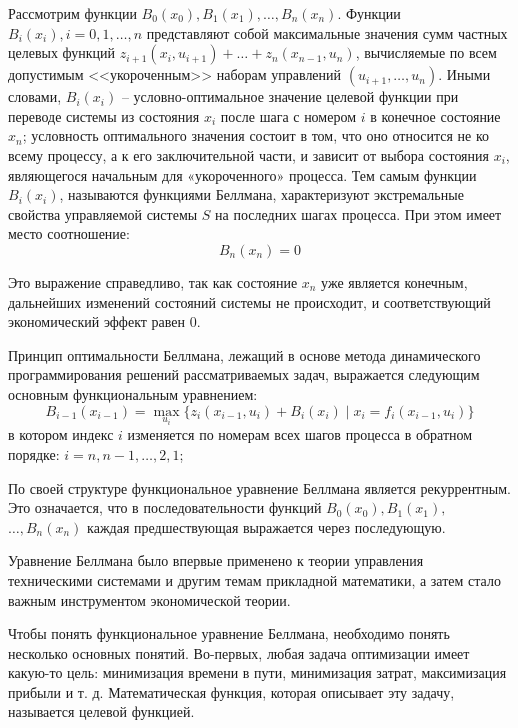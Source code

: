 Рассмотрим функции $B_0(x_0), B_1(x_1), \hdots, B_n(x_n)$. Функции $B_i(x_i), i = 0,1, \hdots, n$ представляют собой максимальные значения сумм частных целевых функций $z_{i+1}(x_i, u_{i+1}) + \hdots +z_n(x_{n−1}, u_n)$, вычисляемые по всем допустимым <<укороченным>> наборам управлений $(u_{i+1}, \hdots,u_n)$. Иными словами, $B_i(x_i)$ -- условно-оптимальное значение целевой функции при переводе системы из состояния $x_i$ после шага с номером $i$ в конечное состояние $x_n$; условность оптимального значения состоит в том, что оно относится не ко всему процессу, а к его заключительной части, и зависит от выбора состояния $x_i$, являющегося начальным для «укороченного» процесса. Тем самым функции $B_i(x_i)$, называются функциями Беллмана, характеризуют экстремальные свойства управляемой системы $S$ на последних шагах процесса. При этом имеет место соотношение:
\begin{equation}
    B_n(x_n) = 0
\end{equation}

Это выражение справедливо, так как состояние $x_n$ уже является конечным, дальнейших изменений состояний системы не происходит, и соответствующий экономический эффект равен 0.

Принцип оптимальности Беллмана, лежащий в основе метода динамического программирования решений рассматриваемых задач, выражается следующим основным функциональным уравнением:
\begin{equation}\label{eq:bellman}
    B_{i-1}(x_{i-1}) = \max_{u_i}\{z_i(x_{i-1}, u_i) + B_i(x_i) \; | \; x_i = f_i(x_{i-1}, u_i)\}
\end{equation}
в котором индекс $i$ изменяется по номерам всех шагов процесса в обратном порядке: $i = n, n-1, \hdots , 2, 1$;

По своей структуре функциональное уравнение Беллмана является рекуррентным. Это означается, что в последовательности функций $B_0(x_0), B_1(x_1),$ $\hdots, B_n(x_n)$ каждая предшествующая выражается через последующую.

Уравнение Беллмана было впервые применено к теории управления техническими системами и другим темам прикладной математики, а затем стало важным инструментом экономической теории.

Чтобы понять функциональное уравнение Беллмана, необходимо понять несколько основных понятий. Во-первых, любая задача оптимизации имеет какую-то цель: минимизация времени в пути, минимизация затрат, максимизация прибыли и т. д. Математическая функция, которая описывает эту задачу, называется целевой функцией.

